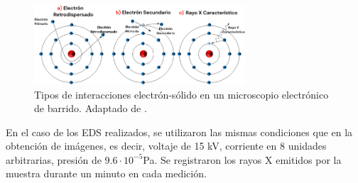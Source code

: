 \documentclass[../main.tex]{subfiles}
\begin{document}
\begin{figure}[H]
    \centering
    \includegraphics[width=0.7\textwidth]{fig/semtipos.png}
    \caption{Tipos de interacciones electrón-sólido en un microscopio electrónico de barrido. Adaptado de \cite{Jensen2022}.}
    \label{semtipos}
\end{figure}
En el caso de los EDS realizados, se utilizaron las mismas condiciones que en la obtención de imágenes, es decir, voltaje de 15 kV, corriente en 8 unidades arbitrarias, presión de $9.6\cdot10^{-5}$Pa. Se registraron los rayos X emitidos por la muestra durante un minuto en cada medición.
\end{document}
